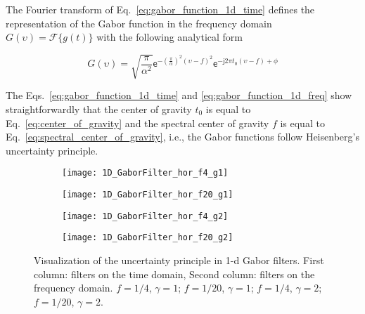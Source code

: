 The Fourier transform of Eq.\ \eqref{eq:gabor_function_1d_time} defines the representation of the Gabor function in the frequency domain $G(\upsilon) = \mathcal{F}\{g(t)\}$ with the following analytical form

\begin{equation}\label{eq:gabor_function_1d_freq}
    G(\upsilon) =  \sqrt{\frac{\pi}{\alpha^2}} \mathsf{e}^{-\left(\frac{\pi}{\alpha}\right) ^{2} (\upsilon-f)^2} \mathsf{e}^{-\mathsf{j} 2 \pi t_0 (\upsilon-f) + \phi}
\end{equation}

The Eqs.\ \eqref{eq:gabor_function_1d_time} and \eqref{eq:gabor_function_1d_freq} show straightforwardly that the center of gravity $t_0$ is equal to Eq.\ \eqref{eq:center_of_gravity} and the spectral center of gravity $f$ is equal to Eq.\ \eqref{eq:spectral_center_of_gravity}, i.e., the Gabor functions follow Heisenberg's uncertainty principle.   

\begin{figure}[!ht] 

	\centering
	\begin{subfigure}[t]{\textwidth+20pt\relax}
    	\texttt{[image: 1D\_GaborFilter\_hor\_f4\_g1]}
    \end{subfigure}\vspace{-1ex}
	\begin{subfigure}[t]{\textwidth+20pt\relax}
    	\texttt{[image: 1D\_GaborFilter\_hor\_f20\_g1]}
    \end{subfigure}\vspace{-1ex}
	\begin{subfigure}[t]{\textwidth+20pt\relax}
    	\texttt{[image: 1D\_GaborFilter\_hor\_f4\_g2]}
    \end{subfigure}\vspace{-1ex}
	\begin{subfigure}[t]{\textwidth+20pt\relax}
    	\texttt{[image: 1D\_GaborFilter\_hor\_f20\_g2]}
    \end{subfigure}\vspace{-1ex}
	
  	\caption{Visualization of the uncertainty principle in 1-d Gabor filters. First column: filters on the time domain, Second column: filters on the frequency domain.  $f = 1/4$, $\gamma = 1$;  $f = 1/20$, $\gamma = 1$;  $f = 1/4$, $\gamma = 2$;  $f = 1/20$, $\gamma = 2$.}
  \label{fig:examples_1D_GaborFilter}
\end{figure}

